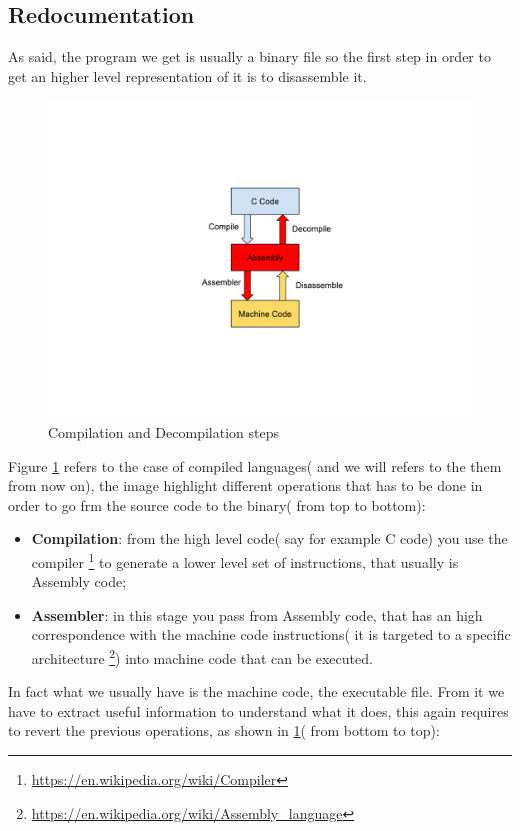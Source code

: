 \documentclass{article}
\begin{document}
\subsection{Redocumentation}
\label{section:redocumentation}
As said, the program we get is usually a binary file so the first step in order to get an higher level representation of it is to disassemble it.
\begin{figure}[htp]
    \centering
    \includegraphics[width=1\textwidth]{images/redocumentation.pdf}
    \caption{Compilation and Decompilation steps \citep{SlideReverse}}
    \label{fig:redocumentation}
\end{figure}
Figure \ref{fig:redocumentation} refers to the case of compiled languages( and we will refers to the them from now on), the image highlight different operations that has to be done in order to go frm the source code to the binary( from top to bottom):
\begin{itemize}
    \item \textbf{Compilation}: from the high level code( say for example C code) you use the compiler \footnote{\url{https://en.wikipedia.org/wiki/Compiler}} to generate a lower level set of instructions, that usually is Assembly code;
    \item \textbf{Assembler}: in this stage you pass from Assembly code, that has an high correspondence with the machine code instructions( it is targeted to a specific architecture \footnote{\url{https://en.wikipedia.org/wiki/Assembly_language}}) into machine code that can be executed.
\end{itemize}
In fact what we usually have is the machine code, the executable file. From it we have to extract useful information to understand what it does, this again requires to revert the previous operations, as shown in \ref{fig:redocumentation}( from bottom to top):
\end{document}
